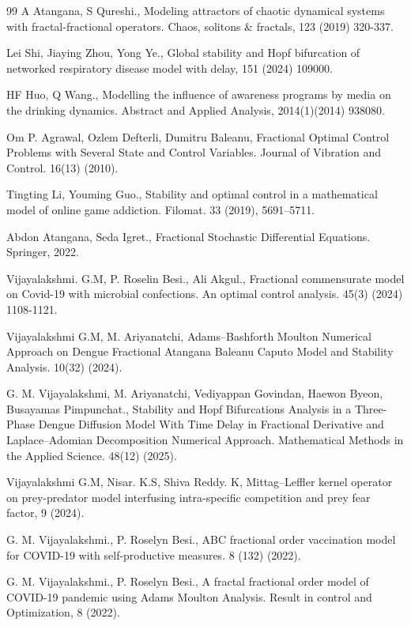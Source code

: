 \documentclass[10pt]{NSP1}
\begin{document}
\begin{thebibliography}{99}
A Atangana, S Qureshi., Modeling attractors of chaotic dynamical systems with fractal-fractional operators. Chaos, solitons \& fractals, 123 (2019) 320-337.

Lei Shi, Jiaying Zhou, Yong Ye., Global stability and Hopf bifurcation of networked respiratory disease model with delay, 151 (2024) 109000.

HF Huo, Q Wang., Modelling the influence of awareness programs by media on the drinking dynamics. Abstract and Applied Analysis, 2014(1)(2014) 938080.

Om P. Agrawal, Ozlem Defterli, Dumitru Baleanu, Fractional Optimal Control Problems with Several State and Control Variables. Journal of Vibration and Control. 16(13) (2010).

Tingting Li, Youming Guo., Stability and optimal control in a mathematical model of online game addiction. Filomat. 33 (2019), 5691–5711.

Abdon Atangana, Seda Igret., Fractional Stochastic Differential Equations. Springer, 2022.

Vijayalakshmi. G.M, P. Roselin Besi., Ali Akgul., Fractional commensurate model on Covid-19 with microbial confections. An optimal control analysis. 45(3) (2024) 1108-1121.

Vijayalakshmi G.M, M. Ariyanatchi, Adams–Bashforth Moulton Numerical Approach on Dengue Fractional Atangana Baleanu Caputo Model and Stability Analysis. 10(32) (2024).

G. M. Vijayalakshmi, M. Ariyanatchi, Vediyappan Govindan, Haewon Byeon, Busayamas Pimpunchat., Stability and Hopf Bifurcations Analysis in a Three-Phase Dengue Diffusion Model With Time Delay in Fractional Derivative and Laplace–Adomian Decomposition Numerical Approach. Mathematical Methods in the Applied Science. 48(12) (2025).

Vijayalakshmi G.M, Nisar. K.S, Shiva Reddy. K, Mittag–Leffler kernel operator on prey-predator model interfusing intra-specific competition and prey fear factor, 9 (2024).

G. M. Vijayalakshmi., P. Roselyn Besi., ABC fractional order vaccination model for COVID-19 with self-productive measures. 8 (132) (2022).

G. M. Vijayalakshmi., P. Roselyn Besi., A fractal fractional order model of COVID-19 pandemic using Adams Moulton Analysis. Result in control and Optimization, 8 (2022).

\end{thebibliography}
\end{document}
